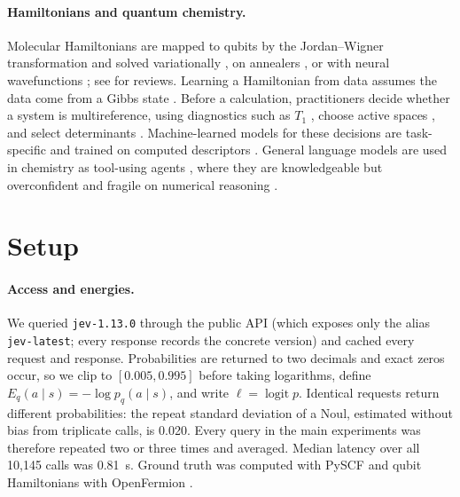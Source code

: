 \documentclass[11pt]{article}
\begin{document}
\paragraph{Hamiltonians and quantum chemistry.}
Molecular Hamiltonians are mapped to qubits by the Jordan--Wigner transformation \citep{jordan1928pauli} and solved variationally \citep{peruzzo2014variational,omalley2016scalable}, on annealers \citep{xia2018electronic,genin2019quantum}, or with neural wavefunctions \citep{carleo2017solving,pfau2020ab,hermann2020deep}; see \citep{mcardle2020quantum,cao2019quantum} for reviews.
Learning a Hamiltonian from data assumes the data come from a Gibbs state \citep{nguyen2017inverse,wiebe2014hamiltonian,anshu2021sample}.
Before a calculation, practitioners decide whether a system is multireference, using diagnostics such as $T_1$ \citep{lee1989diagnostic,jiang2012multireference}, choose active spaces \citep{sayfutyarova2017automated,jeong2020automation}, and select determinants \citep{huron1973iterative,holmes2016heat,coe2018machine}.
Machine-learned models for these decisions are task-specific and trained on computed descriptors \citep{duan2020data,liu2020rapid,janet2017predicting}.
General language models are used in chemistry as tool-using agents \citep{bran2024augmenting,boiko2023autonomous}, where they are knowledgeable but overconfident \citep{mirza2025framework} and fragile on numerical reasoning \citep{mirzadeh2024gsm}.

\section{Setup}
\label{sec:setup}

\paragraph{Access and energies.}
We queried \texttt{jev-1.13.0} through the public API (which exposes only the alias \texttt{jev-latest}; every response records the concrete version) and cached every request and response.
Probabilities are returned to two decimals and exact zeros occur, so we clip to $[0.005,0.995]$ before taking logarithms, define $E_q(a\mid s)=-\log p_q(a\mid s)$, and write $\ell=\operatorname{logit}p$.
Identical requests return different probabilities: the repeat standard deviation of a Noul, estimated without bias from triplicate calls, is 0.020.
Every query in the main experiments was therefore repeated two or three times and averaged.
Median latency over all 10,145 calls was 0.81~s. Ground truth was computed with PySCF \citep{sun2020recent} and qubit Hamiltonians with OpenFermion \citep{mcclean2020openfermion}.
\end{document}
